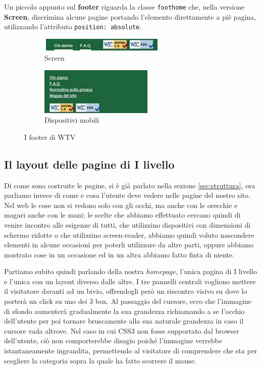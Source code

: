 Un piccolo appunto sul \textbf{footer} riguarda la classe \texttt{foothome}
che, nella versione \textbf{Screen}, discrimina alcune pagine portando
l'elemento direttamente a piè pagina, utilizzando l'attributo
\texttt{position: absolute}.
\begin{figure}[h!]
        \centering
        \begin{subfigure}[b]{0.3\textwidth}
                \includegraphics[height=0.62cm,width=6cm]{images/pres_footer.jpg}
                \caption{Screen}
                \label{fig:Footer-screen}
        \end{subfigure}
        \hspace{4cm}
        \begin{subfigure}[b]{0.3\textwidth}
                \includegraphics[height=2.25cm,width=5.4cm]{images/pres_footer_m.jpg}
                \caption{Dispositivi mobili}
                \label{fig:Footer-mobile}
        \end{subfigure}
        \caption{I footer di WTV}\label{fig:Display-Footer}
\end{figure}

\subsection{Il layout delle pagine di I livello}\label{sec:Pres-Iliv}
Di come sono costruite le pagine, si è già parlato nella sezione
\ref{sec:struttura}, ora parliamo invece di come e cosa l'utente deve vedere
nelle pagine del nostro sito.
Nel web le cose non si vedono solo con gli occhi, ma anche con le orecchie e
magari anche con le mani; le scelte che abbiamo effettuato cercano quindi di
venire incontro alle esigenze di tutti, che utilizzino dispositivi con
dimensioni di schermo ridotte o che utilizzino screen-reader, abbiamo quindi
voluto nascondere elementi in alcune occasioni per poterli utilizzare da altre
parti, oppure abbiamo mostrato cose in un occasione ed in un altra abbiamo
fatto finta di niente.

Partiamo subito quindi parlando della nostra \textit{homepage}, l'unica pagina
di I livello e l'unica con un layout diverso dalle altre. I tre pannelli
centrali vogliono mettere il visitatore davanti ad un bivio, offrendogli però
un riscontro visivo su dove lo porterà un click su uno dei 3 box. Al
passaggio del cursore, ecco che l'immagine di sfondo aumenterà gradualmente la
sua grandezza richiamando a se l'occhio dell'utente per poi tornare
bruscamente alla sua naturale grandezza in caso il cursore vada altrove. Nel
caso in cui CSS3 non fosse supportato dal browser dell'utente, ciò non
comporterebbe disagio poiché l'immagine verrebbe istantaneamente ingrandita,
permettendo al visitatore di comprendere che sta per scegliere la categoria
sopra la quale ha fatto scorrere il mouse.

